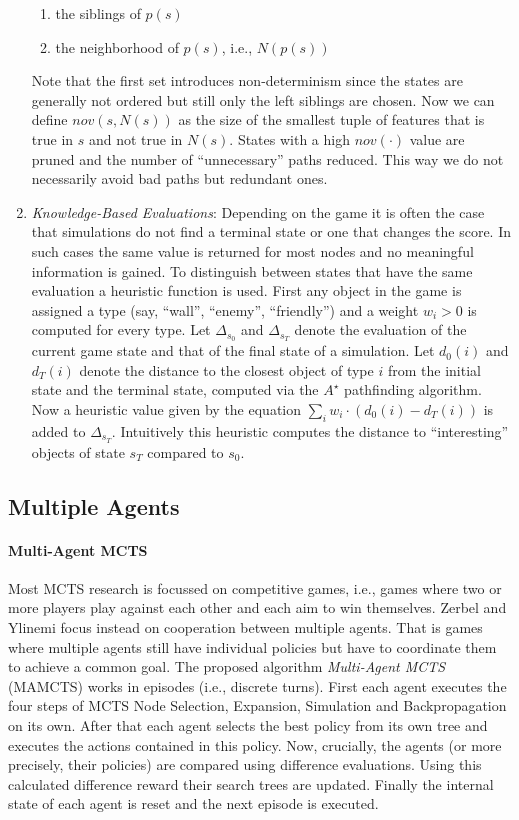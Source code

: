 \begin{enumerate}[label=\alph*)]
\begin{enumerate}[label=\roman*)]
        \item the siblings of $p(s)$
        \item the neighborhood of $p(s)$, i.e., $N(p(s))$
    \end{enumerate}
    Note that the first set introduces non-determinism since the states are generally not ordered but still only the left siblings are chosen. Now we can define $nov(s,N(s))$ as the size of the smallest tuple of features that is true in $s$ and not true in $N(s)$. States with a high $nov(\cdot)$ value are pruned and the number of \enquote{unnecessary} paths reduced. This way we do not necessarily avoid bad paths but redundant ones.
    \item \textit{Knowledge-Based Evaluations}: Depending on the game it is often the case that simulations do not find a terminal state or one that changes the score. In such cases the same value is returned for most nodes and no meaningful information is gained. To distinguish between states that have the same evaluation a heuristic function is used. First any object in the game is assigned a type (say, \enquote{wall}, \enquote{enemy}, \enquote{friendly}) and a weight $w_i > 0$ is computed for every type. Let $\Delta_{s_0}$ and $\Delta_{s_T}$ denote the evaluation of the current game state and that of the final state of a simulation. Let $d_0(i)$ and $d_T(i)$ denote the distance to the closest object of type $i$ from the initial state and the terminal state, computed via the $A^\star$ pathfinding algorithm. Now a heuristic value given by the equation $\sum_i w_i \cdot (d_0(i) - d_T(i))$ is added to $\Delta_{s_T}$. Intuitively this heuristic computes the distance to \enquote{interesting} objects of state $s_T$ compared to $s_0$. 
\end{enumerate}
\newpage
\subsection{Multiple Agents}
\label{ss:multi_agents}
\paragraph{Multi-Agent MCTS}
Most MCTS research is focussed on competitive games, i.e., games where two or more players play against each other and each aim to win themselves. Zerbel and Ylinemi \cite{zerbel2019multiagent} focus instead on cooperation between multiple agents. That is games where multiple agents still have individual policies but have to coordinate them to achieve a common goal. The proposed algorithm \textit{Multi-Agent MCTS} (MAMCTS) works in episodes (i.e., discrete turns). First each agent executes the four steps of MCTS Node Selection, Expansion, Simulation and Backpropagation on its own. After that each agent selects the best policy from its own tree and executes the actions contained in this policy. Now, crucially, the agents (or more precisely, their policies) are compared using difference evaluations. Using this calculated difference reward their search trees are updated. Finally the internal state of each agent is reset and the next episode is executed.
